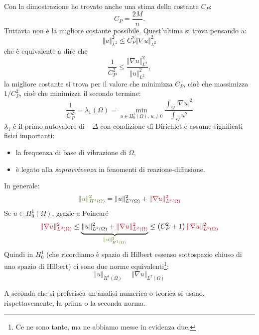 \documentclass[10pt,a4paper,twoside,openright]{book}
\begin{document}
\begin{oss}
	Con la dimostrazione ho trovato anche una stima della costante $\displaystyle C_{P}$:
	\begin{equation*}
		C_{P} =\frac{2M}{n} .
	\end{equation*}
	Tuttavia non è la migliore costante possibile. Quest'ultima si trova pensando a:
	\begin{equation*}
		\Vert u\Vert _{L^{2}}^{2} \leqslant C_{P}^{2}\Vert \nabla u\Vert _{L^{2}}^{2}
	\end{equation*}
	che è equivalente a dire che
	\begin{equation*}
		\frac{1}{C_{P}^{2}} \leqslant \frac{\Vert \nabla u\Vert _{L^{2}}^{2}}{\Vert u\Vert _{L^{2}}^{2}} ,
	\end{equation*}
	la migliore costante si trova per il valore che minimizza $\displaystyle C_{P}$, cioè che massimizza $\displaystyle 1/C_{P}^{2}$, cioè che minimizza il secondo termine:
	\begin{equation}
		\frac{1}{C_{P}^{2}} =\lambda _{1}( \Omega ) =\min_{u\in H_{0}^{1}( \Omega ) ,\ u\neq 0}\frac{\int _{\Omega }| \nabla u| ^{2}}{\int _{\Omega } u^{2}}
	\end{equation}
	$\displaystyle \lambda _{1}$ è il primo autovalore di $\displaystyle -\Delta $ con condizione di Dirichlet e assume significati fisici importanti:
	\begin{itemize}
		\item la frequenza di base di vibrazione di $\displaystyle \Omega $,
		\item è legato alla \textit{sopravvivenza} in fenomenti di reazione-diffusione.
	\end{itemize}
\end{oss}
\begin{oss}
	In generale:
	\begin{equation*}
		\textcolor[rgb]{0.25,0.46,0.02}{\Vert u\Vert _{H^{1}( \Omega )}^{2}} =\Vert u\Vert _{L^{2}( \Omega )}^{2} +\textcolor[rgb]{0.82,0.01,0.11}{\Vert \nabla u\Vert _{L^{2}( \Omega )}^{2}}
	\end{equation*}
	Se $\displaystyle u\in H_{0}^{1}( \Omega )$, grazie a Poincaré
	\begin{equation}
		\textcolor[rgb]{0.82,0.01,0.11}{\Vert \nabla u\Vert _{L^{2}( \Omega )}^{2}} \leqslant \underbrace{\Vert u\Vert _{L^{2}( \Omega )}^{2} +\textcolor[rgb]{0.82,0.01,0.11}{\Vert \nabla u\Vert _{L^{2}( \Omega )}^{2}}}_{\textcolor[rgb]{0.25,0.46,0.02}{\Vert u\Vert _{H^{1}( \Omega )}^{2}}} \leqslant \left( C_{P}^{2} +1\right)\textcolor[rgb]{0.82,0.01,0.11}{\Vert \nabla u\Vert _{L^{2}( \Omega )}^{2}}
		\label{eq:af-stima-poincare}
	\end{equation}
	Quindi in $\displaystyle H_{0}^{1}$ (che ricordiamo è spazio di Hilbert essenso sottospazio chiuso di uno spazio di Hilbert) ci sono due norme equivalenti\footnote{Ce ne sono tante, ma ne abbiamo messe in evidenza due.}:
	\begin{equation*}
		\Vert u\Vert _{H^{1}( \Omega )} \ \ \ \ \ \ \Vert \nabla u\Vert _{L^{2}( \Omega )}
	\end{equation*}
\end{oss}
A seconda che si preferisca un'analisi numerica o teorica si usano, rispettavemente, la prima o la seconda norma.
\end{document}
